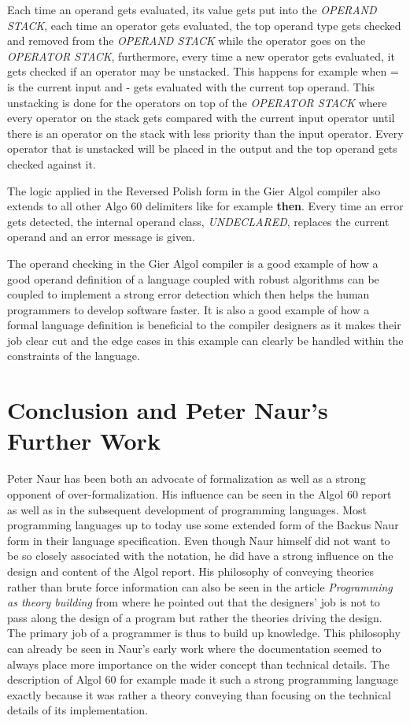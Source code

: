\documentclass{article}
\begin{document}
Each time an operand gets evaluated, its value gets put into the \textit{OPERAND STACK}, each time an operator gets evaluated, the top operand type gets checked and removed from the \textit{OPERAND STACK} while the operator goes on the \textit{OPERATOR STACK}, furthermore, every time a new operator gets evaluated, it gets checked if an operator may be unstacked. This happens for example when = is the current input and - gets evaluated with the current top operand. This unstacking is done for the operators on top of the \textit{OPERATOR STACK} where every operator on the stack gets compared with the current input operator until there is an operator on the stack with less priority than the input operator. Every operator that is unstacked will be placed in the output and the top operand gets checked against it.

The logic applied in the Reversed Polish form in the Gier Algol compiler also extends to all other Algo 60 delimiters like for example \textbf{then}. Every time an error gets detected, the internal operand class, \textit{UNDECLARED}, replaces the current operand and an error message is given.

The operand checking in the Gier Algol compiler is a good example of how a good operand definition of a language coupled with robust algorithms can be coupled to implement a strong error detection which then helps the human programmers to develop software faster. It is also a good example of how a formal language definition is beneficial to the compiler designers as it makes their job clear cut and the edge cases in this example can clearly be handled within the constraints of the language.
\newpage
\section{Conclusion and Peter Naur's Further Work}
Peter Naur has been both an advocate of formalization as well as a strong opponent of over-formalization. His influence can be seen in the Algol 60 report as well as in the subsequent development of programming languages. Most programming languages up to today use some extended form of the Backus Naur form in their language specification. Even though Naur himself did not want to be so closely associated with the notation, he did have a strong influence on the design and content of the Algol report. His philosophy of conveying theories rather than brute force information can also be seen in the article \textit{Programming as theory building} from \cite{naur1985programming} where he pointed out that the designers' job is not to pass along the design of a program but rather the theories driving the design. The primary job of a programmer is thus to build up knowledge. This philosophy can already be seen in Naur's early work where the documentation seemed to always place more importance on the wider concept than technical details. The description of Algol 60 for example made it such a strong programming language exactly because it was rather a theory conveying than focusing on the technical details of its implementation.
\end{document}
